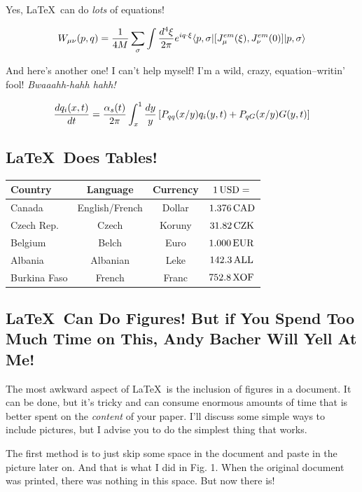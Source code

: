 \documentclass [12pt] {article}
\begin{document}
Yes, \LaTeX\ can do {\it lots} of equations!

\[ W_{\mu \nu} (p,q)= {1\over 4M} \sum_\sigma \int {d^4 \xi\over 2\pi}
e^{iq\cdot \xi} \langle p,\sigma | [J^{em}_\mu (\xi), J^{em}_\nu (0)]
| p,\sigma \rangle
\]

And here's another one!   I can't help myself!  I'm a wild, crazy,
equation--writin' fool!   {\it Bwaaahh-hahh hahh!}

\[ {dq_i(x,t)\over dt}= {\alpha_s(t)\over 2\pi} \int_x^1 {dy\over y}
\left[ P_{qq}(x/y) q_i(y,t)+ P_{qG}(x/y) G(y,t) \right]
\]


\subsection{\LaTeX\ Does Tables!}

\begin{center}
\begin {tabular}
{ | l || c | c | c |} \hline {\bf Country} & {\bf Language} & {\bf
Currency} & $1\,{\rm USD}=$\\ \hline\hline Canada & English/French
& Dollar & $1.376\,{\rm CAD}$ \\ \hline Czech Rep. & Czech &
Koruny &$31.82\,{\rm CZK}$ \\ \hline Belgium & Belch & Euro &
$1.000\,{\rm
EUR}$ \\ \hline Albania & Albanian & Leke & $142.3\,{\rm ALL}$ \\
\hline
Burkina Faso & French & Franc & $752.8\,{\rm XOF}$ \\
\hline
\end{tabular}
\end{center}


\subsection{\LaTeX\ Can Do Figures! But if You Spend Too Much
Time on This, Andy Bacher Will Yell At Me!}

The most awkward aspect of \LaTeX\ is the inclusion of figures in
a document.  It can be done, but it's tricky and can consume
enormous amounts of time that is better spent on the {\it
content\/} of your paper. I'll discuss some simple ways to include
pictures, but I advise you to do the simplest thing that works.

The first method is to just skip some space
in the document and paste in the
picture later on.  And that is what I did in Fig. 1.  When the
original document was printed, there was nothing in this
space.  But now there is!
\end{document}
